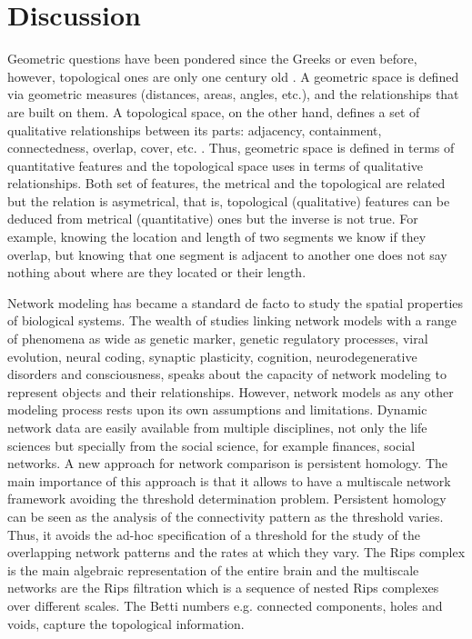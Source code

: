 \documentclass[onecollarge,runningheads]{svjour2}
\begin{document}
\section{Discussion}
\label{se:discuss}
Geometric questions have been pondered since the Greeks or even before, however, topological ones are only one century old  \cite{edelsbrunner2010computational}. A geometric space is defined via geometric measures (distances, areas, angles, etc.), and the relationships that are built on them. A topological space, on the other hand, defines a set of qualitative relationships between its parts: adjacency, containment, connectedness, overlap, cover, etc. \cite{aleksandrov1999mathematics}. Thus, geometric space is defined in terms of quantitative features and the topological space uses
in terms of qualitative relationships.  Both set of features, the metrical and the topological are related but the relation is asymetrical, that is, topological (qualitative) features can be deduced from metrical (quantitative) ones but the inverse is not true. For example, knowing the location and length of two segments we know if they overlap, but knowing that one segment is adjacent to another one does not say nothing about where are they located or their length.

Network modeling has became a standard de facto to study the spatial properties of biological systems. The wealth of studies linking network models with a range of phenomena as wide as genetic marker, genetic regulatory processes, viral evolution, neural coding, synaptic plasticity, cognition, neurodegenerative disorders and consciousness, speaks about the capacity of network modeling to represent objects and their relationships. However, network models as any other modeling process rests upon its own assumptions and limitations.
Dynamic network data are easily available from multiple disciplines, not only the life sciences but specially from the social science, for example finances, social networks. A new approach for network comparison is persistent homology. The main importance of this approach is that it allows to have a multiscale network framework avoiding the threshold determination problem. Persistent homology can be seen as the analysis of the connectivity pattern as the threshold varies. Thus, it avoids the ad-hoc specification of a threshold for the study of the overlapping network patterns and the rates at which they vary.
The Rips complex is the main algebraic representation of the entire brain and the multiscale networks are the Rips filtration which is a sequence of nested Rips complexes over different scales. The Betti numbers e.g. connected components, holes and voids, capture the topological information.
\end{document}

